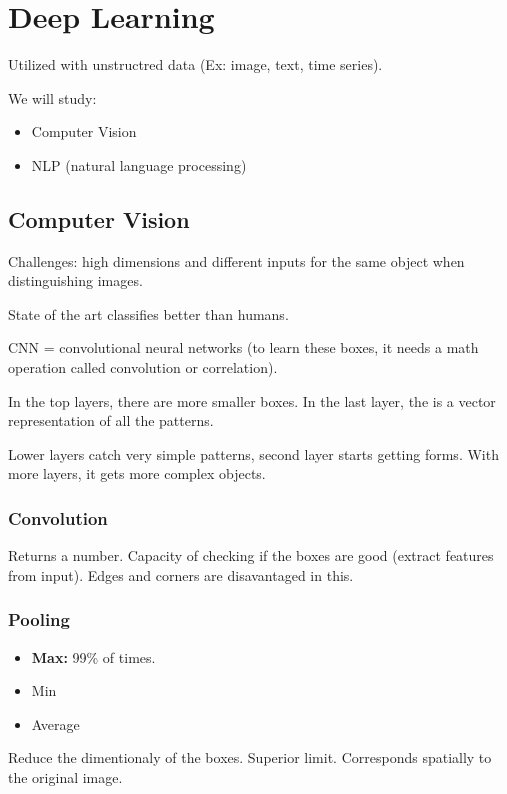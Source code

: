 \documentclass[11pt]{article}
\date{\today}
\title{}
\begin{document}
\tableofcontents


\section{Deep Learning}
\label{sec:org78bcb19}
Utilized with unstructred data (Ex: image, text, time series).

We will study:
\begin{itemize}
\item Computer Vision
\item NLP (natural language processing)
\end{itemize}

\subsection{Computer Vision}
\label{sec:org0fae647}
Challenges: high dimensions and different inputs for the same object when
distinguishing images.

State of the art classifies better than humans.

CNN = convolutional neural networks (to learn these boxes, it needs a math operation
called convolution or correlation).

In the top layers, there are more smaller boxes. In the last layer, the is a vector
representation of all the patterns.

Lower layers catch very simple patterns, second layer starts getting forms. With more
layers, it gets more complex objects.

\subsubsection{Convolution}
\label{sec:org89a4801}
Returns a number. Capacity of checking if the boxes are good (extract features from
input). Edges and corners are disavantaged in this.

\subsubsection{Pooling}
\label{sec:org98a7f07}
\begin{itemize}
\item \textbf{Max:} 99\% of times.
\item Min
\item Average
\end{itemize}

Reduce the dimentionaly of the boxes. Superior limit. Corresponds spatially to the
original image.
\end{document}
